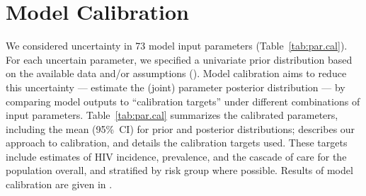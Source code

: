 \section{Model Calibration}\label{mod.cal}
We considered uncertainty in 73 model input parameters (Table~\ref{tab:par.cal}).
For each uncertain parameter, we specified a univariate prior distribution
based on the available data and/or assumptions ().
Model calibration aims to reduce this uncertainty
--- \ie estimate the (joint) parameter posterior distribution ---
by comparing model outputs to ``calibration targets''
under different combinations of input parameters.
Table~\ref{tab:par.cal} summarizes the calibrated parameters,
including the mean (95\%~CI) for prior and posterior distributions;
 describes our approach to calibration, and
 details the calibration targets used.
These targets include estimates of HIV incidence, prevalence, and the cascade of care
for the population overall, and stratified by risk group where possible.
Results of model calibration are given in .



